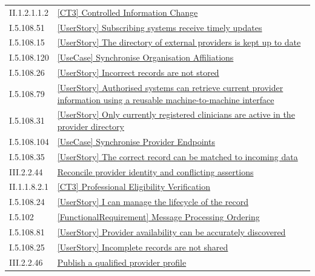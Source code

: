 \begin{longtable}{p{.22\linewidth}p{.73\linewidth}}
II.1.2.1.1.2 & \hyperref[element:2eed03f280434e369d7118b63259c02d]{[CT3] Controlled Information Change} \\
I.5.108.51 & \hyperref[element:2ff2646e206e4c1b858d9ba55d47c759]{[UserStory] Subscribing systems receive timely updates} \\
I.5.108.15 & \hyperref[element:310732384e694e538218c9517ad05c4b]{[UserStory] The directory of external providers is kept up to date} \\
I.5.108.120 & \hyperref[element:3207a46c804a4970985b8408adec78d9]{[UseCase] Synchronise Organisation Affiliations} \\
I.5.108.26 & \hyperref[element:337891deb5da4243940d08b73aaa42de]{[UserStory] Incorrect records are not stored} \\
I.5.108.79 & \hyperref[element:352baa927e6949ac8e205eec7c88f426]{[UserStory] Authorised systems can retrieve current provider information using a reusable machine-to-machine interface} \\
I.5.108.31 & \hyperref[element:37f684bc328647ec96d7dd26fb85a373]{[UserStory] Only currently registered clinicians are active in the provider directory} \\
I.5.108.104 & \hyperref[element:382576c61ec5489086ab157203429f93]{[UseCase] Synchronise Provider Endpoints} \\
I.5.108.35 & \hyperref[element:393c655bd3e54369bcb2a990c4108c77]{[UserStory] The correct record can be matched to incoming data} \\
III.2.2.44 & \hyperref[element:3afbc885a4a74b24a1240acb8725bad2]{Reconcile provider identity and conflicting assertions} \\
II.1.1.8.2.1 & \hyperref[element:3b43d350a52a4b608bc01eb2530a91be]{[CT3] Professional Eligibility Verification} \\
I.5.108.24 & \hyperref[element:3bf9961924644f4a9608895afbc60619]{[UserStory] I can manage the lifecycle of the record} \\
I.5.102 & \hyperref[element:3c11adccd7194276b787416368c13858]{[FunctionalRequirement] Message Processing Ordering} \\
I.5.108.81 & \hyperref[element:42e9d1da1d0948aa88911f480f652b73]{[UserStory] Provider availability can be accurately discovered} \\
I.5.108.25 & \hyperref[element:44e8f7956f4347bfb6995396f5c30f2a]{[UserStory] Incomplete records are not shared} \\
III.2.2.46 & \hyperref[element:4522e0c4204e4c0c93d2b1f9ef3887ad]{Publish a qualified provider profile} \\

\end{longtable}
